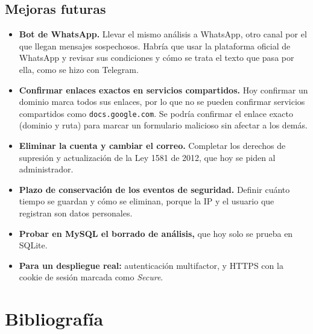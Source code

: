 \documentclass[journal,onecolumn,12pt,draftclsnofoot]{IEEEtran}
\begin{document}
\subsection{Mejoras futuras}

\begin{itemize}
  \item \textbf{Bot de WhatsApp.} Llevar el mismo análisis a WhatsApp, otro canal por el que llegan mensajes sospechosos. Habría que usar la plataforma oficial de WhatsApp y revisar sus condiciones y cómo se trata el texto que pasa por ella, como se hizo con Telegram.
  \item \textbf{Confirmar enlaces exactos en servicios compartidos.} Hoy confirmar un dominio marca todos sus enlaces, por lo que no se pueden confirmar servicios compartidos como \texttt{docs.google.com}. Se podría confirmar el enlace exacto (dominio y ruta) para marcar un formulario malicioso sin afectar a los demás.
  \item \textbf{Eliminar la cuenta y cambiar el correo.} Completar los derechos de supresión y actualización de la Ley 1581 de 2012, que hoy se piden al administrador.
  \item \textbf{Plazo de conservación de los eventos de seguridad.} Definir cuánto tiempo se guardan y cómo se eliminan, porque la IP y el usuario que registran son datos personales.
  \item \textbf{Probar en MySQL el borrado de análisis,} que hoy solo se prueba en SQLite.
  \item \textbf{Para un despliegue real:} autenticación multifactor, y HTTPS con la cookie de sesión marcada como \emph{Secure}.
\end{itemize}

\makeatletter
\g@addto@macro\UrlBreaks{\do\-}
\makeatother

\section{Bibliografía}

\begingroup
\makeatletter
\let\addcontentsline\@gobblethree
\def\section*#1{}
\makeatother


\endgroup
\end{document}
